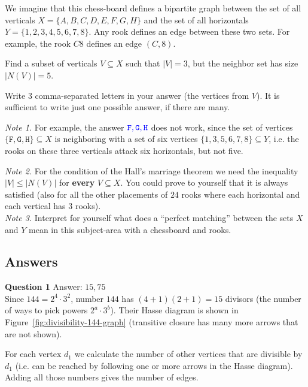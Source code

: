 \documentclass[jou]{apa6}
\begin{document}
We imagine that this chess-board defines a bipartite graph between the  
set of all verticals $X= \{ A,B,C,D,E,F,G,H \}$ and the set of all 
horizontals $Y= \{ 1,2,3,4,5,6,7,8 \}$. Any rook defines an edge between these two sets. 
For example, the rook $C8$ defines an edge $(C,8)$. 

Find a subset of verticals $V \subseteq X$ such that $|V|=3$, but
the neighbor set has size $|N(V)| = 5$.

Write $3$ comma-separated letters in your answer (the vertices from $V$). It is 
sufficient to write just one possible answer, if there are many.

\vspace{10pt}
{\em Note 1.} For example, the answer $\textcolor{blue}{\mathtt{F,G,H}}$ does not work, 
since the set of vertices $\{ \mathtt{F},\mathtt{G},\mathtt{H} \} \subseteq X$ 
is neighboring with a set of six vertices
$\{ 1,3,5,6,7,8 \} \subseteq Y$, i.e. the rooks on these three verticals
attack six horizontals, but not five.

{\em Note 2.} For the condition of the Hall's marriage theorem we need the inequality $|V| \leq |N(V)|$ 
for {\bf every} $V \subseteq X$. You could prove to yourself that it is always satisfied
(also for all the other placements of $24$ rooks where each horizontal and each 
vertical has $3$ rooks).\\
{\em Note 3.} Interpret for yourself what does a ``perfect matching'' between the sets
$X$ and $Y$ mean in this subject-area with a chessboard and rooks.




\newpage

\subsection{Answers}


\vspace{4pt}
{\bf Question 1} Answer: $15,75$\\
Since $144 = 2^4 \cdot 3^2$, number $144$ has $(4+1)(2+1) = 15$ divisors
(the number of ways to pick powers $2^a \cdot 3^b$). 
Their Hasse diagram is shown in Figure~\ref{fig:divisibility-144-graph}
(transitive closure has many more arrows that are not shown). 

For each vertex $d_1$ we calculate the number of other vertices that
are divisible by $d_1$ (i.e. can be reached by following one or more arrows in the
Hasse diagram). Adding all those numbers gives the number of edges.
\end{document}

